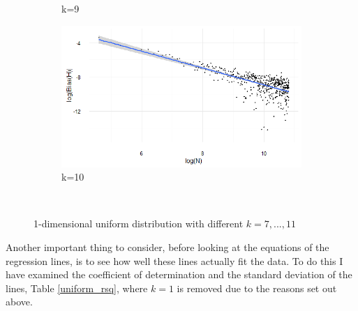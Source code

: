 \documentclass[12pt]{report}
\begin{document}
\begin{figure}
{\begin{subfigure}[b]{.6\textwidth}
\caption{k=9}
\end{subfigure}%
\begin{subfigure}[b]{.6\textwidth}
\centering
\includegraphics[width=\textwidth]{./Graphs/Best/Uniform_k=10.png}
\caption{k=10}
\end{subfigure}%
}\    
\caption{1-dimensional uniform distribution with different $k = 7, ..., 11 $} \label{Uniform_graphs711}
\end{figure}

Another important thing to consider, before looking at the equations of the regression lines, is to see how well these lines actually fit the data. To do this I have examined the coefficient of determination and the standard deviation of the lines, Table \ref{uniform_rsq}, where $k=1$ is removed due to the reasons set out above.
\end{document}
